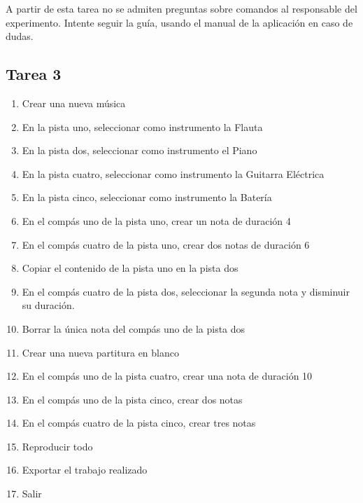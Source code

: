 A partir de esta tarea no se admiten preguntas sobre comandos al responsable del experimento.
Intente seguir la gu\'ia, usando el manual de la aplicaci\'on en caso de dudas.

\subsection{Tarea 3}

\begin{enumerate}
    \item Crear una nueva m\'usica
    \item En la pista uno, seleccionar como instrumento la Flauta
    \item En la pista dos, seleccionar como instrumento el Piano
    \item En la pista cuatro, seleccionar como instrumento la Guitarra El\'ectrica
    \item En la pista cinco, seleccionar como instrumento la Bater\'ia
    \item En el comp\'as uno de la pista uno, crear un nota de duraci\'on 4
    \item En el comp\'as cuatro de la pista uno, crear dos notas de duraci\'on 6
    \item Copiar el contenido de la pista uno en la pista dos
    \item En el comp\'as cuatro de la pista dos, seleccionar la segunda nota y disminuir su duraci\'on.
    \item Borrar la \'unica nota del comp\'as uno de la pista dos
    \item Crear una nueva partitura en blanco
    \item En el comp\'as uno de la pista cuatro, crear una nota de duraci\'on 10
    \item En el comp\'as uno de la pista cinco, crear dos notas
    \item En el comp\'as cuatro de la pista cinco, crear tres notas
    \item Reproducir todo
    \item Exportar el trabajo realizado
    \item Salir
\end{enumerate}

